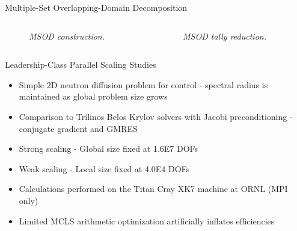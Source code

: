 \documentclass{beamer}
\begin{document}
\begin{frame}{Multiple-Set Overlapping-Domain Decomposition}

  \begin{columns}

    \begin{column}{0.5\textwidth}

      \begin{figure}[htpb!]
        \begin{center}
          \scalebox{0.25}{  }
        \end{center}
        \caption{\small \sl MSOD construction.}
      \end{figure}

    \end{column}

    \begin{column}{0.5\textwidth}

      \begin{figure}[htpb!]
        \begin{center}
          \scalebox{0.25}{  }
        \end{center}
        \caption{\small \sl MSOD tally reduction.}
      \end{figure}

    \end{column}

  \end{columns}

\end{frame}

\begin{frame}{Leadership-Class Parallel Scaling Studies}

  \begin{itemize}
  \item Simple 2D neutron diffusion problem for control - spectral
    radius is maintained as global problem size grows
    \medskip
  \item Comparison to Trilinos Belos Krylov solvers with Jacobi
    preconditioning - conjugate gradient and GMRES
    \medskip
  \item Strong scaling - Global size fixed at 1.6E7 DOFs
    \medskip
  \item Weak scaling - Local size fixed at 4.0E4 DOFs
    \medskip
  \item Calculations performed on the Titan Cray XK7 machine at ORNL
    (MPI only)
    \medskip
  \item Limited MCLS arithmetic optimization artificially inflates
    efficiencies
  \end{itemize}

\end{frame}
\end{document}
